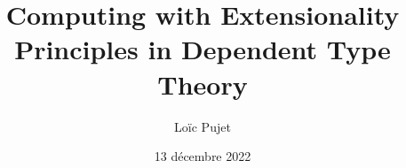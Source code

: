 \documentclass[
	a4paper, %
	fontsize=10pt, %
	twoside=false, %
	numbers=noenddot, %
]{kaobook}
\begin{document}


\clearpage
\thispagestyle{empty}
\null%
\clearpage


\titlehead{Computing with Extensionality Principles}
\subject{Thèse de Doctorat}

\title[Computing with Extensionality Principles]{Computing with Extensionality Principles in Dependent Type Theory}

\author[Loïc Pujet]{Loïc Pujet}

\date{13 décembre 2022}

\publishers{École Doctorale MathSTIC}


\frontmatter %





\end{document}
